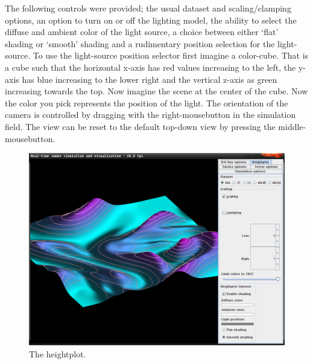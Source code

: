 \documentclass[a4paper,11pt,twoside]{report}
\begin{document}
		The following controls were provided; the usual dataset and scaling/clamping options, an option to turn on or off the lighting model, the ability to select the diffuse and ambient color of the light source, a choice between either `flat' shading or `smooth' shading and a rudimentary position selection for the light-source. To use the light-source position selector first imagine a color-cube. That is a cube such that the horizontal x-axis has red values increasing to the left, the y-axis has blue increasing to the lower right and the vertical z-axis as green increasing towards the top. Now imagine the scene at the center of the cube. Now the color you pick represents the position of the light.
		The orientation of the camera is controlled by dragging with the right-mousebutton in the simulation field. The view can be reset to the default top-down view by pressing the middle-mousebutton.
		\begin{figure}[h]
		\centering
		\includegraphics[scale=\imagescalefactor]{images/step6.png}
		\caption{The heightplot.}\label{fig:step6}
		\end{figure}
		\clearpage
\end{document}
